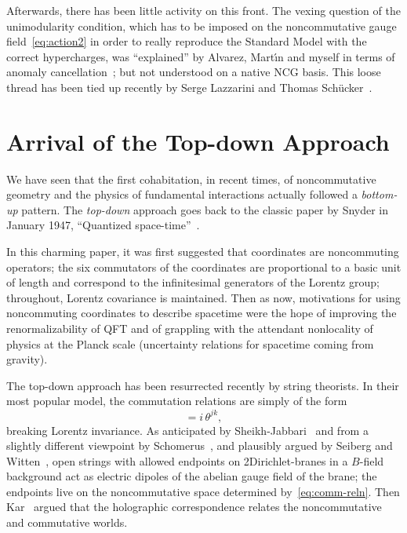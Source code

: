 \documentclass[a4paper,12pt]{article}
\newcommand{\1}{\mathbf{1}}         %
\newcommand{\7}{\dagger}            %
\newcommand{\8}{\bullet}            %
\renewcommand{\.}{\cdot}            %
\renewcommand{\:}{\colon}           %
\begin{document}
Afterwards, there has been little activity on this front. The vexing
question of the unimodularity condition, which has to be imposed on
the noncommutative gauge field~\eqref{eq:action2} in order to really
reproduce the Standard Model with the correct hypercharges, was
``explained'' by Alvarez, Mart\'{\i}n and myself in terms of anomaly
cancellation~\cite{Chiron}; but not understood on a native NCG basis.
This loose thread has been tied up recently by Serge Lazzarini and
Thomas Sch\"ucker~\cite{LazzariniS}.



\section{Arrival of the Top-down Approach}

We have seen that the first cohabitation, in recent times, of
noncommutative geometry and the physics of fundamental interactions
actually followed a \textit{bottom-up} pattern. The \textit{top-down}
approach goes back to the classic paper by Snyder in January 1947,
``Quantized space-time''~\cite{Snyder}.

In this charming paper, it was first suggested that coordinates are
noncommuting operators; the six commutators of the coordinates are
proportional to a basic unit of length and correspond to the
infinitesimal generators of the Lorentz group; throughout, Lorentz
covariance is maintained. Then as now, motivations for using
noncommuting coordinates to describe spacetime were the hope of
improving the renormalizability of QFT and of grappling with the
attendant nonlocality of physics at the Planck scale (uncertainty
relations for spacetime coming from gravity).

The top-down approach has been resurrected recently by string
theorists. In their most popular model, the commutation relations are
simply of the form
\begin{equation}
[x^j, x^k] = i\, \theta^{jk},
\label{eq:comm-reln}
\end{equation}
breaking Lorentz invariance. As anticipated by
Sheikh-Jabbari~\cite{Jabbari} and from a slightly different viewpoint
by Schomerus~\cite{Schomerus}, and plausibly argued by Seiberg and
Witten~\cite{SeibergW}, open strings with allowed endpoints on
2Dirich\-let-branes in a $B$-field background act as electric dipoles
of the abelian gauge field of the brane; the endpoints live on the
noncommutative space determined by~\eqref{eq:comm-reln}. Then
Kar~\cite{Kar} argued that the holographic correspondence relates the
noncommutative and commutative worlds.
\end{document}
